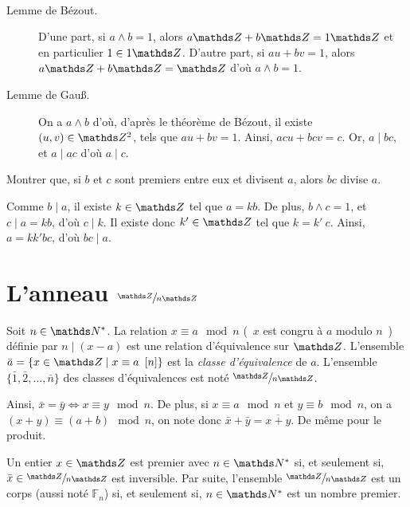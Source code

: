 \begin{prv}~\\[-2\baselineskip]
	\begin{description}
		\item[Lemme de Bézout.] D'une part, si $a \wedge b = 1$, alors $a\Z + b\Z = 1\Z$ et en particulier $1 \in 1 \Z$. D'autre part, si $a u + bv = 1$, alors $a \Z + b\Z = \Z$ d'où $a \wedge b = 1$.
		\item[Lemme de Gau\ss.] On a $a \wedge b$ d'où, d'après le théorème de Bézout, il existe $(u,v) \in \Z^2$, tels que $au + bv = 1$. Ainsi, $ac u + bc v = c$.
			Or, $a  \mid  bc$, et $a  \mid ac$ d'où $a  \mid c$.
	\end{description}
\end{prv}

\begin{exo}
	\begin{slshape}
		Montrer que, si $b$ et $c$ sont premiers entre eux et divisent $a$, alors $bc$ divise $a$.
	\end{slshape}

	Comme $b \mid a$, il existe $k \in \Z$ tel que $a = kb$.
	De plus, $b \wedge c = 1$, et $c  \mid a = kb$, d'où $c  \mid k$.
	Il existe donc $k' \in \Z$ tel que $k = k'\:c$.
	Ainsi, $a = kk'bc$, d'où $bc  \mid  a$.
\end{exo}

\section{L'anneau $\sfrac\Z{n\Z}$}

\begin{defn}
	Soit $n \in \N^*$. La relation $x \equiv a \mod n$ (\guillemotleft~$x$ est congru à $a$ modulo $n$~\guillemotright) définie par $n  \mid (x-a)$ est une relation d'équivalence sur $\Z$. L'ensemble $\bar{a} = \{x \in \Z \mid x \equiv a \mod n\}$ est la \textit{classe d'équivalence} de $a$. L'ensemble $\{\bar 1, \bar 2, \ldots, \bar{n} \}$ des classes d'équivalences est noté $\sfrac\Z{n\Z}$.
\end{defn}

Ainsi, $\bar{x} = \bar{y} \iff x \equiv y \mod n$.
De plus, si $x \equiv a \mod n$ et $y \equiv b \mod n$, on a $(x + y) \equiv (a + b) \mod n$, on note donc $\bar{x} + \bar{y} = \overline{x+y}$.
De même pour le produit.

\begin{prop}
	Un entier $x \in \Z$ est premier avec $n \in \N^*$ si, et seulement si, $\bar{x} \in \sfrac\Z{n\Z}$ est inversible. Par suite, l'ensemble $\sfrac \Z {n\Z}$ est un corps (aussi noté $\mathds{F}_n$) si, et seulement si, $n \in \N^*$ est un nombre premier.
\end{prop}

